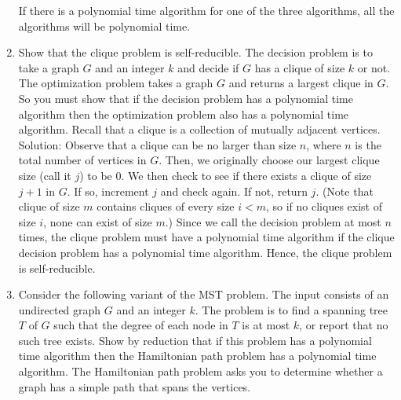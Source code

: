 \documentclass{article}
\begin{document}
\begin{enumerate}
If there is a polynomial time algorithm for one of the three algorithms, all the algorithms will be polynomial time.
\newline
\setcounter{enumi}{9}
\item Show that the clique problem is self-reducible. The decision problem is to take a graph $G$ and an integer $k$ and decide if $G$ has a clique of size $k$ or not. The optimization problem takes a graph $G$ and returns a largest clique in $G$. So you must show that if the decision problem has a polynomial time algorithm then the optimization problem also has a polynomial time algorithm. Recall that a clique is a collection of mutually adjacent vertices.
\newline
\newline Solution: Observe that a clique can be no larger than size $n$, where $n$ is the total number of vertices in $G$. Then, we originally choose our largest clique size (call it $j$) to be 0. We then check to see if there exists a clique of size $j+1$ in $G$. If so, increment $j$ and check again. If not, return $j$. (Note that clique of size $m$ contains cliques of every size $i<m$, so if no cliques exist of size $i$, none can exist of size $m$.) Since we call the decision problem at most $n$ times, the clique problem must have a polynomial time algorithm if the clique decision problem has a polynomial time algorithm. Hence, the clique problem is self-reducible.
\newline
\setcounter{enumi}{14}
\item Consider the following variant of the MST problem. The input consists of an undirected graph $G$ and an integer $k$. The problem is to find a spanning tree $T$ of $G$ such that the degree of each node in $T$ is at most $k$, or report that no such tree exists. Show by reduction that if this problem has a polynomial time algorithm then the Hamiltonian path problem has a polynomial time algorithm. The Hamiltonian path problem asks you to determine whether a graph has a simple path that spans the vertices.
\newline

\end{enumerate}
\end{document}
